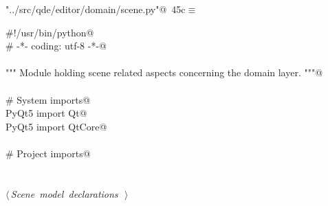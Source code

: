 \documentclass[
    a4paper,      %
    10pt,         %
    openright,    %
    notitlepage,  %
    parskip=half, %
]{scrreprt}       %
\theoremstyle{definition}                    %
\begin{document}
\begin{flushleft} \small
\begin{minipage}{\linewidth}\label{scrap53}\raggedright\small
{} \verb@"../src/qde/editor/domain/scene.py"@\nobreak\ {\footnotesize {45c}}$\equiv$
\vspace{-1ex}
\begin{list}{}{} \item
\mbox{}\lstinline@#!/usr/bin/python@\\
\mbox{}\lstinline@# -*- coding: utf-8 -*-@\\
\mbox{}\lstinline@@\\
\mbox{}\lstinline@""" Module holding scene related aspects concerning the domain layer. """@\\
\mbox{}\lstinline@@\\
\mbox{}\lstinline@# System imports@\\
\mbox{}\lstinline@from PyQt5 import Qt@\\
\mbox{}\lstinline@from PyQt5 import QtCore@\\
\mbox{}\lstinline@@\\
\mbox{}\lstinline@# Project imports@\\
\mbox{}\lstinline@@\\
\mbox{}\lstinline@@\\
\mbox{}\lstinline@@\hbox{$\langle\,${\itshape Scene model declarations}\nobreak\ {\footnotesize {}}$\,\rangle$}\lstinline@@\\
\mbox{}\lstinline@@{\NWsep}
\end{list}
\vspace{-1.5ex}
\footnotesize
\begin{list}{}{\setlength{\itemsep}{-\parsep}\setlength{\itemindent}{-\leftmargin}}

\item{}
\end{list}
\end{minipage}\vspace{4ex}
\end{flushleft}
\end{document}
